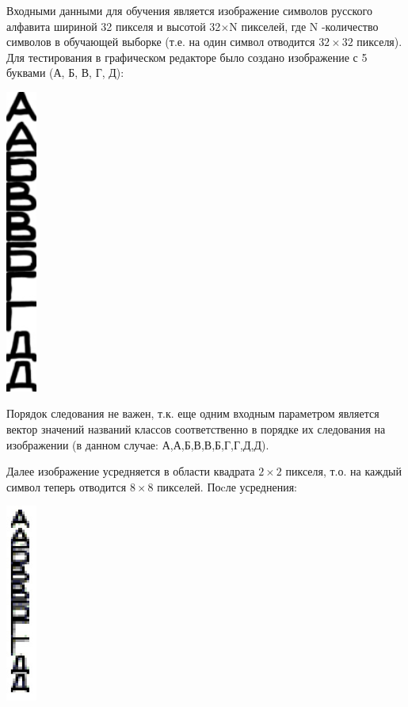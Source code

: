 Входными данными для обучения является изображение символов русского алфавита шириной 32 пикселя и высотой 32$\times$N пикселей, где N -количество символов в обучающей выборке (т.е. на один символ отводится $32\times 32$ пикселя). Для тестирования в графическом редакторе было создано изображение с 5 буквами (А, Б, В, Г, Д):
\begin{center}
	\includegraphics[width=1cm]{image_for_report/teach_5.jpg}
\end{center}

Порядок следования не важен, т.к. еще одним входным параметром является вектор значений названий классов соответственно в порядке их следования на изображении (в данном случае: {А,А,Б,В,В,Б,Г,Г,Д,Д}).

Далее изображение усредняется в области квадрата $2\times 2$ пикселя, т.о. на каждый символ теперь отводится $8\times 8$ пикселей. Поcле усреднения:
\begin{center}
	\includegraphics[width=1cm]{image_for_report/teach_5_2.jpg}
\end{center}

